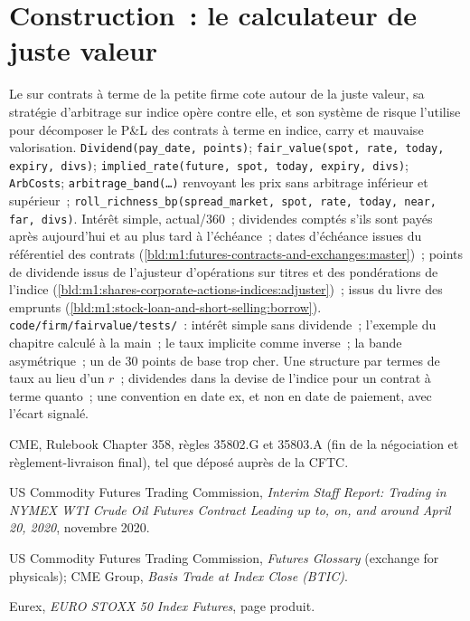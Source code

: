 \section{Construction~: le calculateur de juste valeur}\label{bld:m1:basis-roll-and-delivery:fv}

\begin{build}
 Le  sur contrats à terme de la petite firme cote autour
de la juste valeur, sa stratégie d'arbitrage sur indice opère contre elle, et son système de risque
l'utilise pour décomposer le P\&L des contrats à terme en indice, carry et mauvaise valorisation.
 \texttt{Dividend(pay\_date, points)};
\texttt{fair\_value(spot, rate, today, expiry, divs)};
\texttt{implied\_rate(future, spot, today, expiry, divs)};
\texttt{ArbCosts}; \texttt{arbitrage\_band(\ldots)} renvoyant les prix sans arbitrage inférieur et
supérieur~; \texttt{roll\_richness\_bp(spread\_market, spot,
rate, today, near, far, divs)}.  Intérêt simple, actual/360~; dividendes comptés s'ils sont payés après
aujourd'hui et au plus tard à l'échéance~; dates d'échéance issues du référentiel des contrats
(\cref{bld:m1:futures-contracts-and-exchanges:master})~; points de dividende issus
de l'ajusteur d'opérations sur titres et des pondérations de l'indice
(\cref{bld:m1:shares-corporate-actions-indices:adjuster})~;  issus du
livre des emprunts (\cref{bld:m1:stock-loan-and-short-selling:borrow}).
 \texttt{code/firm/fairvalue/tests/}~: intérêt simple
sans dividende~; l'exemple du chapitre calculé à la main~; le taux implicite
comme inverse~; la bande asymétrique~; un  de 30 points de base trop cher.
 Une structure par termes de taux au lieu d'un $r$~; dividendes dans
la devise de l'indice pour un contrat à terme quanto~; une convention en date ex, et non en date de
paiement, avec l'écart signalé.
\end{build}

\begin{omsources}
\item CME, Rulebook Chapter 358, règles 35802.G et 35803.A (fin de la
négociation et règlement-livraison final), tel que déposé auprès de la CFTC.
\item US Commodity Futures Trading Commission, \emph{Interim Staff Report:
Trading in NYMEX WTI Crude Oil Futures Contract Leading up to, on, and around
April 20, 2020}, novembre 2020.
\item US Commodity Futures Trading Commission, \emph{Futures Glossary}
(exchange for physicals); CME Group, \emph{Basis Trade at Index Close (BTIC)}.
\item Eurex, \emph{EURO STOXX 50 Index Futures}, page produit.
\end{omsources}

